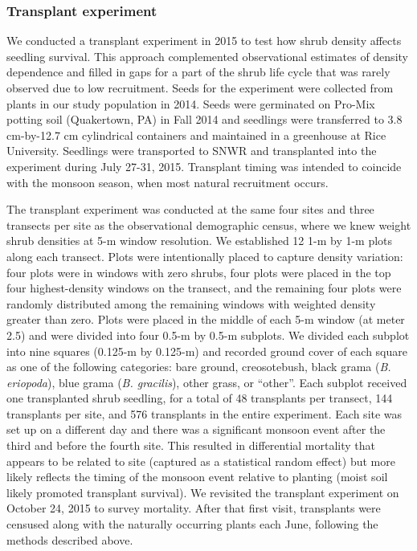 \documentclass[11pt]{article}\usepackage[]{graphicx}\usepackage[usenames,dvipsnames]{xcolor}
\begin{document}
\subsubsection*{Transplant experiment}
We conducted a transplant experiment in 2015 to test how shrub density affects seedling survival. 
This approach complemented observational estimates of density dependence and filled in gaps for a part of the shrub life cycle that was rarely observed due to low recruitment. 
Seeds for the experiment were collected from plants in our study population in 2014.
Seeds were germinated on Pro-Mix potting soil (Quakertown, PA) in Fall 2014 and seedlings were transferred to 3.8 cm-by-12.7 cm cylindrical containers and maintained in a greenhouse at Rice University.
Seedlings were transported to SNWR and transplanted into the experiment during July 27-31, 2015.
Transplant timing was intended to coincide with the monsoon season, when most natural recruitment occurs. 

The transplant experiment was conducted at the same four sites and three transects per site as the observational demographic census, where we knew weight shrub densities at 5-m window resolution. 
We established 12 1-m by 1-m plots along each transect. 
Plots were intentionally placed to capture density variation: four plots were in windows with zero shrubs, four plots were placed in the top four highest-density windows on the transect, and the remaining four plots were randomly distributed among the remaining windows with weighted density greater than zero. 
Plots were placed in the middle of each 5-m window (at meter 2.5) and were divided into four 0.5-m by 0.5-m subplots.
We divided each subplot into nine squares (0.125-m by 0.125-m) and recorded ground cover of each square as one of the following categories: bare ground, creosotebush, black grama (\textit{B. eriopoda}), blue grama (\textit{B. gracilis}), other grass, or ``other''.
Each subplot received one transplanted shrub seedling, for a total of 48 transplants per transect, 144 transplants per site, and 576 transplants in the entire experiment. 
Each site was set up on a different day and there was a significant monsoon event after the third and before the fourth site. 
This resulted in differential mortality that appears to be related to site (captured as a statistical random effect) but more likely reflects the timing of the monsoon event relative to planting (moist soil likely promoted transplant survival). 
We revisited the transplant experiment on October 24, 2015 to survey mortality. 
After that first visit, transplants were censused along with the naturally occurring plants each June, following the methods described above. 
\end{document}
